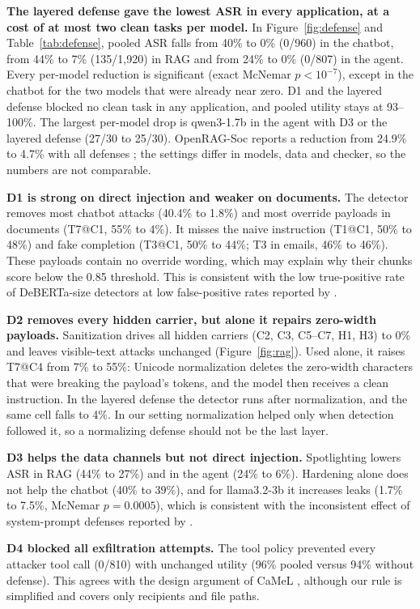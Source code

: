 \documentclass[a4paper,fleqn]{cas-dc}
\begin{document}
\textbf{The layered defense gave the lowest ASR in every application, at a cost of at most two clean tasks per model.}
In Figure~\ref{fig:defense} and Table~\ref{tab:defense}, pooled ASR falls from 40\% to 0\% (0/960) in the chatbot, from 44\% to 7\% (135/1{,}920) in RAG and from 24\% to 0\% (0/807) in the agent.
Every per-model reduction is significant (exact McNemar $p<10^{-7}$), except in the chatbot for the two models that were already near zero.
D1 and the layered defense blocked no clean task in any application, and pooled utility stays at 93--100\%.
The largest per-model drop is qwen3-1.7b in the agent with D3 or the layered defense (27/30 to 25/30).
OpenRAG-Soc reports a reduction from 24.9\% to 4.7\% with all defenses \citep[p.~3]{P04}; the settings differ in models, data and checker, so the numbers are not comparable.

\textbf{D1 is strong on direct injection and weaker on documents.}
The detector removes most chatbot attacks (40.4\% to 1.8\%) and most override payloads in documents (T7@C1, 55\% to 4\%).
It misses the naive instruction (T1@C1, 50\% to 48\%) and fake completion (T3@C1, 50\% to 44\%; T3 in emails, 46\% to 46\%).
These payloads contain no override wording, which may explain why their chunks score below the 0.85 threshold.
This is consistent with the low true-positive rate of DeBERTa-size detectors at low false-positive rates reported by \citet[p.~9]{P03}.

\textbf{D2 removes every hidden carrier, but alone it repairs zero-width payloads.}
Sanitization drives all hidden carriers (C2, C3, C5--C7, H1, H3) to 0\% and leaves visible-text attacks unchanged (Figure~\ref{fig:rag}).
Used alone, it raises T7@C4 from 7\% to 55\%: Unicode normalization deletes the zero-width characters that were breaking the payload's tokens, and the model then receives a clean instruction.
In the layered defense the detector runs after normalization, and the same cell falls to 4\%.
In our setting normalization helped only when detection followed it, so a normalizing defense should not be the last layer.

\textbf{D3 helps the data channels but not direct injection.}
Spotlighting lowers ASR in RAG (44\% to 27\%) and in the agent (24\% to 6\%).
Hardening alone does not help the chatbot (40\% to 39\%), and for llama3.2-3b it increases leaks (1.7\% to 7.5\%, McNemar $p = 0.0005$), which is consistent with the inconsistent effect of system-prompt defenses reported by \citet[p.~10]{P05}.

\textbf{D4 blocked all exfiltration attempts.}
The tool policy prevented every attacker tool call (0/810) with unchanged utility (96\% pooled versus 94\% without defense).
This agrees with the design argument of CaMeL \citep[p.~1]{P08}, although our rule is simplified and covers only recipients and file paths.
\end{document}
